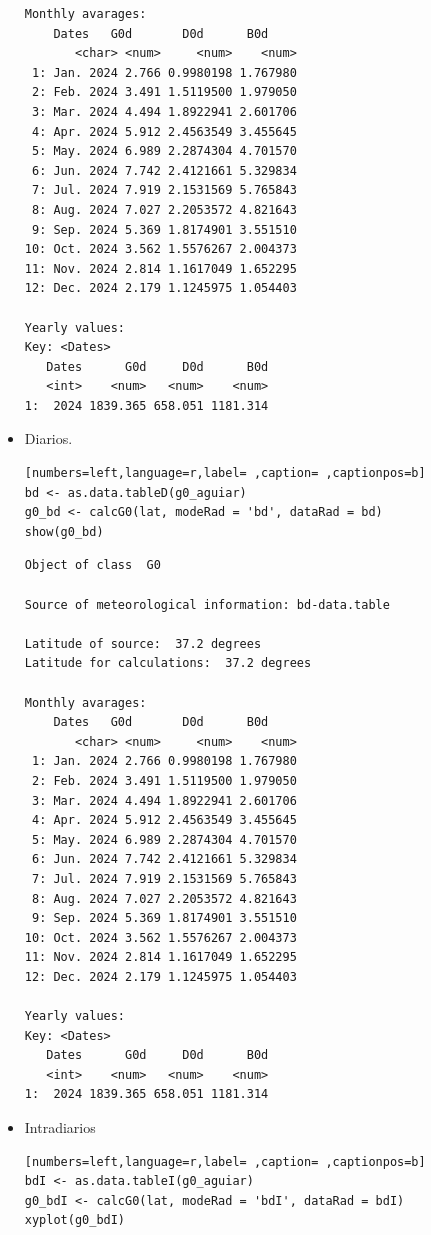 \begin{itemize}
\begin{verbatim}
Monthly avarages:
	Dates   G0d       D0d      B0d
       <char> <num>     <num>    <num>
 1: Jan. 2024 2.766 0.9980198 1.767980
 2: Feb. 2024 3.491 1.5119500 1.979050
 3: Mar. 2024 4.494 1.8922941 2.601706
 4: Apr. 2024 5.912 2.4563549 3.455645
 5: May. 2024 6.989 2.2874304 4.701570
 6: Jun. 2024 7.742 2.4121661 5.329834
 7: Jul. 2024 7.919 2.1531569 5.765843
 8: Aug. 2024 7.027 2.2053572 4.821643
 9: Sep. 2024 5.369 1.8174901 3.551510
10: Oct. 2024 3.562 1.5576267 2.004373
11: Nov. 2024 2.814 1.1617049 1.652295
12: Dec. 2024 2.179 1.1245975 1.054403

Yearly values:
Key: <Dates>
   Dates      G0d     D0d      B0d
   <int>    <num>   <num>    <num>
1:  2024 1839.365 658.051 1181.314
\end{verbatim}

\item Diarios.
\begin{lstlisting}[numbers=left,language=r,label= ,caption= ,captionpos=b]
bd <- as.data.tableD(g0_aguiar)
g0_bd <- calcG0(lat, modeRad = 'bd', dataRad = bd)
show(g0_bd)
\end{lstlisting}

\begin{verbatim}
Object of class  G0 

Source of meteorological information: bd-data.table 

Latitude of source:  37.2 degrees
Latitude for calculations:  37.2 degrees

Monthly avarages:
	Dates   G0d       D0d      B0d
       <char> <num>     <num>    <num>
 1: Jan. 2024 2.766 0.9980198 1.767980
 2: Feb. 2024 3.491 1.5119500 1.979050
 3: Mar. 2024 4.494 1.8922941 2.601706
 4: Apr. 2024 5.912 2.4563549 3.455645
 5: May. 2024 6.989 2.2874304 4.701570
 6: Jun. 2024 7.742 2.4121661 5.329834
 7: Jul. 2024 7.919 2.1531569 5.765843
 8: Aug. 2024 7.027 2.2053572 4.821643
 9: Sep. 2024 5.369 1.8174901 3.551510
10: Oct. 2024 3.562 1.5576267 2.004373
11: Nov. 2024 2.814 1.1617049 1.652295
12: Dec. 2024 2.179 1.1245975 1.054403

Yearly values:
Key: <Dates>
   Dates      G0d     D0d      B0d
   <int>    <num>   <num>    <num>
1:  2024 1839.365 658.051 1181.314
\end{verbatim}

\item Intradiarios
\begin{lstlisting}[numbers=left,language=r,label= ,caption= ,captionpos=b]
bdI <- as.data.tableI(g0_aguiar)
g0_bdI <- calcG0(lat, modeRad = 'bdI', dataRad = bdI)
xyplot(g0_bdI)
\end{lstlisting}


\end{itemize}
